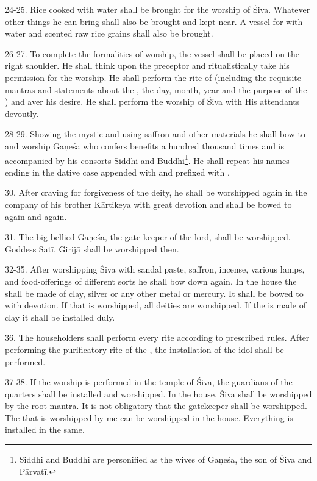 24-25. Rice cooked with water shall be brought for the worship of Śiva. Whatever
other things he can bring shall also be brought and kept near. A vessel for
 with water and scented raw rice grains shall also be brought.

26-27. To complete the formalities of worship, the vessel shall be placed on
the right shoulder. He shall think upon the preceptor and ritualistically take
his permission for the worship. He shall perform the rite of 
(including the requisite mantras and statements about the , the day,
month, year \etc and the purpose of the ) and aver his desire. He shall
perform the worship of Śiva with His attendants devoutly.

28-29. Showing the mystic  and using saffron and other materials he
shall bow to and worship Gaṇeśa who confers benefits a hundred thousand times
and is accompanied by his consorts Siddhi and Buddhi\footnote{Siddhi and Buddhi
are personified as the wives of Gaṇeśa, the son of Śiva and Pārvatī.}. He shall
repeat his names ending in the dative case appended with  and prefixed
with .

30. After craving for forgiveness of the deity, he shall be worshipped again in
the company of his brother Kārtikeya with great devotion and shall be bowed to
again and again.

31. The big-bellied Gaṇeśa, the gate-keeper of the lord, shall be worshipped.
Goddess Satī, Girijā shall be worshipped then.

32-35. After worshipping Śiva with sandal paste, saffron, incense, various lamps,
and food-offerings of different sorts he shall bow down again. In the house
the  shall be made of clay, silver or any other metal or mercury. It
shall be bowed to with devotion. If that is worshipped, all deities are
worshipped. If the  is made of clay it shall be installed duly.

36. The householders shall perform every rite according to prescribed rules.
After performing the purificatory rite of the , the installation of
the idol shall be performed.

37-38. If the worship is performed in the temple of Śiva, the guardians of
the quarters shall be installed and worshipped. In the house, Śiva shall be
worshipped by the root mantra. It is not obligatory that the gatekeeper shall
be worshipped. The  that is worshipped by me can be worshipped in
the house. Everything is installed in the same.

